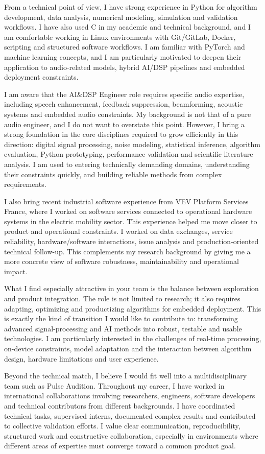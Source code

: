 \documentclass[11pt,a4paper]{../_shared/altacv}
\begin{document}
{From a technical point of view, I have strong experience in Python for algorithm development, data analysis, numerical modeling, simulation and validation workflows. I have also used C in my academic and technical background, and I am comfortable working in Linux environments with Git/GitLab, Docker, scripting and structured software workflows. I am familiar with PyTorch and machine learning concepts, and I am particularly motivated to deepen their application to audio-related models, hybrid AI/DSP pipelines and embedded deployment constraints.

I am aware that the AI\&DSP Engineer role requires specific audio expertise, including speech enhancement, feedback suppression, beamforming, acoustic systems and embedded audio constraints. My background is not that of a pure audio engineer, and I do not want to overstate this point. However, I bring a strong foundation in the core disciplines required to grow efficiently in this direction: digital signal processing, noise modeling, statistical inference, algorithm evaluation, Python prototyping, performance validation and scientific literature analysis. I am used to entering technically demanding domains, understanding their constraints quickly, and building reliable methods from complex requirements.

I also bring recent industrial software experience from VEV Platform Services France, where I worked on software services connected to operational hardware systems in the electric mobility sector. This experience helped me move closer to product and operational constraints. I worked on data exchanges, service reliability, hardware/software interactions, issue analysis and production-oriented technical follow-up. This complements my research background by giving me a more concrete view of software robustness, maintainability and operational impact.

What I find especially attractive in your team is the balance between exploration and product integration. The role is not limited to research; it also requires adapting, optimizing and productizing algorithms for embedded deployment. This is exactly the kind of transition I would like to contribute to: transforming advanced signal-processing and AI methods into robust, testable and usable technologies. I am particularly interested in the challenges of real-time processing, on-device constraints, model adaptation and the interaction between algorithm design, hardware limitations and user experience.

Beyond the technical match, I believe I would fit well into a multidisciplinary team such as Pulse Audition. Throughout my career, I have worked in international collaborations involving researchers, engineers, software developers and technical contributors from different backgrounds. I have coordinated technical tasks, supervised interns, documented complex results and contributed to collective validation efforts. I value clear communication, reproducibility, structured work and constructive collaboration, especially in environments where different areas of expertise must converge toward a common product goal.

}
\end{document}
